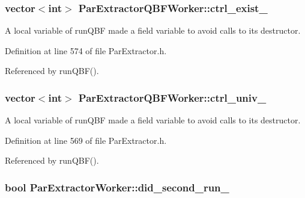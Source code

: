 \hypertarget{classParExtractorQBFWorker_a8e31207c1f8933052cb84f85bd558e4c}{
\subsubsection[{ctrl\-\_\-exist\-\_\-}]{\setlength{\rightskip}{0pt plus 5cm}vector$<$int$>$ Par\-Extractor\-Q\-B\-F\-Worker\-::ctrl\-\_\-exist\-\_\-\hspace{0.3cm}{\ttfamily [protected]}}}\label{classParExtractorQBFWorker_a8e31207c1f8933052cb84f85bd558e4c}


A local variable of run\-Q\-B\-F made a field variable to avoid calls to its destructor. 



Definition at line 574 of file Par\-Extractor.\-h.



Referenced by run\-Q\-B\-F().

\hypertarget{classParExtractorQBFWorker_a5e826e8f53247390d079c650363ed6d3}{
\subsubsection[{ctrl\-\_\-univ\-\_\-}]{\setlength{\rightskip}{0pt plus 5cm}vector$<$int$>$ Par\-Extractor\-Q\-B\-F\-Worker\-::ctrl\-\_\-univ\-\_\-\hspace{0.3cm}{\ttfamily [protected]}}}\label{classParExtractorQBFWorker_a5e826e8f53247390d079c650363ed6d3}


A local variable of run\-Q\-B\-F made a field variable to avoid calls to its destructor. 



Definition at line 569 of file Par\-Extractor.\-h.



Referenced by run\-Q\-B\-F().

\hypertarget{classParExtractorWorker_a99552e89edf3a3925430399207a1b13e}{
\subsubsection[{did\-\_\-second\-\_\-run\-\_\-}]{\setlength{\rightskip}{0pt plus 5cm}bool Par\-Extractor\-Worker\-::did\-\_\-second\-\_\-run\-\_\-\hspace{0.3cm}{\ttfamily [inherited]}}}\label{classParExtractorWorker_a99552e89edf3a3925430399207a1b13e}


